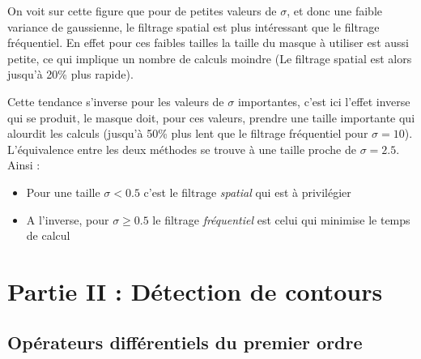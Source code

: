 \documentclass[a4,12pt]{article}
\begin{document}
On voit sur cette figure que pour de petites valeurs de $\sigma$, et donc une faible variance de gaussienne, le filtrage spatial est plus intéressant que le filtrage fréquentiel. En effet pour ces faibles tailles la taille du masque à utiliser est aussi petite, ce qui implique un nombre de calculs moindre (Le filtrage spatial est alors jusqu'à 20\% plus rapide).

Cette tendance s'inverse pour les valeurs de $\sigma$ importantes, c'est ici l'effet inverse qui se produit, le masque doit, pour ces valeurs, prendre une taille importante qui alourdit les calculs (jusqu'à 50\% plus lent que le filtrage fréquentiel pour $\sigma=10$).\\

\noindent
L'équivalence entre les deux méthodes se trouve à une taille proche de $\sigma = 2.5$. Ainsi :
\begin{itemize}
	\item Pour une taille $\sigma < 0.5$ c'est le filtrage \textit{spatial} qui est à privilégier
	\item A l'inverse, pour $\sigma \geq 0.5$ le filtrage \textit{fréquentiel} est celui qui minimise le temps de calcul
\end{itemize}


\section{Partie II : Détection de contours}

\subsection{Opérateurs différentiels du premier ordre}
\end{document}
